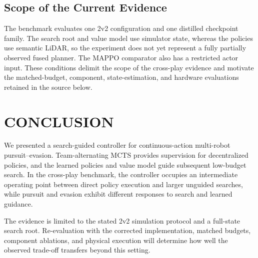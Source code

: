 \documentclass[letterpaper,10pt,conference]{ieeeconf}
\begin{document}
\fi

\subsection{Scope of the Current Evidence}

The benchmark evaluates one 2v2 configuration and one distilled
checkpoint family. The search root and value model use simulator state,
whereas the policies use semantic LiDAR, so the experiment does not yet
represent a fully partially observed fused planner. The MAPPO comparator
also has a restricted actor input. These conditions delimit the scope of
the cross-play evidence and motivate the matched-budget, component,
state-estimation, and hardware evaluations retained in the source below.


\section{CONCLUSION}

We presented a search-guided controller for continuous-action
multi-robot pursuit--evasion. Team-alternating MCTS provides supervision
for decentralized policies, and the learned policies and value model guide
subsequent low-budget search. In the cross-play benchmark, the
controller occupies an intermediate operating point between direct policy
execution and larger unguided searches, while pursuit and evasion exhibit
different responses to search and learned guidance.

The evidence is limited to the stated 2v2 simulation protocol and a
full-state search root. Re-evaluation with the corrected implementation,
matched budgets, component ablations, and physical execution will determine
how well the observed trade-off transfers beyond this setting.

\end{document}

